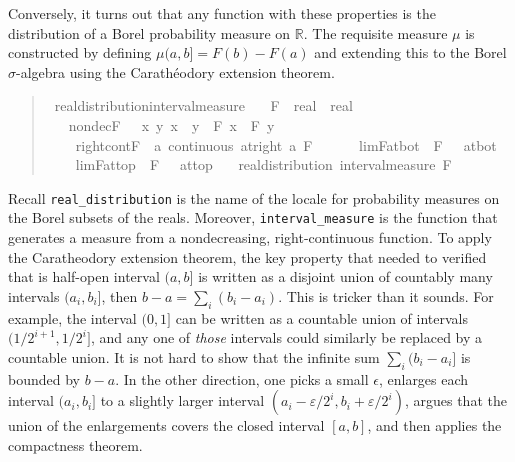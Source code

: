 \documentclass{svjour3}
\newcommand{\RR}{\mathbb{R}}
\begin{document}
Conversely, it turns out that any function with these properties is the distribution of a Borel probability measure on $\RR$. The requisite measure $\mu$ is constructed by defining $\mu (a,b] = F(b) - F(a)$ and extending this to the Borel $\sigma$-algebra using the Carath\'eodory extension theorem.
\begin{quote}
\begin{isabellebody}
\isamarkupfalse%
\ real{\isacharunderscore}distribution{\isacharunderscore}interval{\isacharunderscore}measure{\isacharcolon}\isanewline
\ \ \ F\ {\isacharcolon}{\isacharcolon}\ {\isachardoublequoteopen}real\ {\isasymRightarrow}\ real{\isachardoublequoteclose}\isanewline
\ \ \ nondecF\ {\isacharcolon}\ {\isachardoublequoteopen}{\isasymAnd}\ x\ y{\isachardot}\ x\ {\isasymle}\ y\ {\isasymLongrightarrow}\ F\ x\ {\isasymle}\ F\ y{\isachardoublequoteclose}\ \isanewline
\ \ \ \ right{\isacharunderscore}cont{\isacharunderscore}F\ {\isacharcolon}\ {\isachardoublequoteopen}{\isasymAnd}a{\isachardot}\ continuous\ {\isacharparenleft}at{\isacharunderscore}right\ a{\isacharparenright}\ F{\isachardoublequoteclose}\ \ \isanewline
\ \ \ \ lim{\isacharunderscore}F{\isacharunderscore}at{\isacharunderscore}bot\ {\isacharcolon}\ {\isachardoublequoteopen}{\isacharparenleft}F\ {\isacharminus}{\isacharminus}{\isacharminus}{\isachargreater}\ {}{\isacharparenright}\ at{\isacharunderscore}bot{\isachardoublequoteclose}\ \isanewline
\ \ \ \ lim{\isacharunderscore}F{\isacharunderscore}at{\isacharunderscore}top\ {\isacharcolon}\ {\isachardoublequoteopen}{\isacharparenleft}F\ {\isacharminus}{\isacharminus}{\isacharminus}{\isachargreater}\ {}{\isacharparenright}\ at{\isacharunderscore}top{\isachardoublequoteclose}\isanewline
\ \ \ {\isachardoublequoteopen}real{\isacharunderscore}distribution\ {\isacharparenleft}interval{\isacharunderscore}measure\ F{\isacharparenright}{\isachardoublequoteclose}
\end{isabellebody}
\end{quote}
Recall \texttt{real\_distribution} is the name of the locale for probability measures on the Borel subsets of the reals. Moreover, \texttt{interval\_measure} is the function that generates a measure from a nondecreasing, right-continuous function. To apply the Caratheodory extension theorem, the key property that needed to verified that is half-open interval $(a, b]$ is written as a disjoint union of countably many intervals $(a_i, b_i]$, then $b - a = \sum_i (b_i - a_i)$. This is tricker than it sounds. For example, the interval $(0, 1]$ can be written as a countable union of intervals $(1/2^{i+1}, 1/2^i]$, and any one of \emph{those} intervals could similarly be replaced by a countable union. It is not hard to show that the infinite sum $\sum_i (b_i - a_i]$ is bounded by $b - a$. In the other direction, one picks a small $\epsilon$, enlarges each interval $(a_i, b_i]$ to a slightly larger interval $(a_i - \varepsilon/2^i, b_i + \varepsilon / 2^i)$, argues that the union of the enlargements covers the closed interval $[a, b]$, and then applies the compactness theorem.
\end{document}
